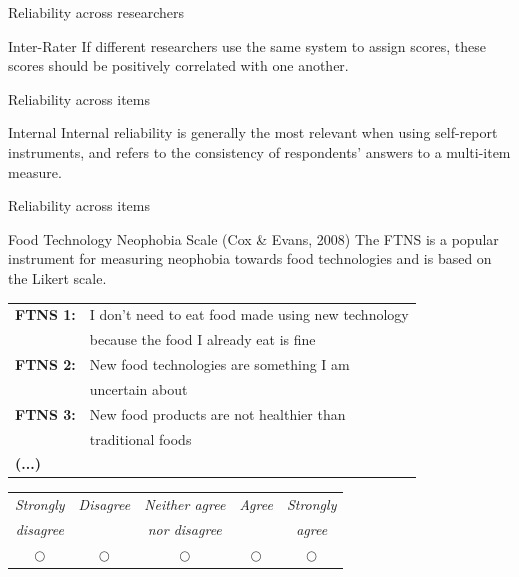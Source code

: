 \documentclass{beamer}
\begin{document}
\begin{frame}{Reliability across researchers}
    \begin{block}{Inter-Rater}
        If different researchers use the same system to assign scores, these scores should be positively correlated with one another.
    \end{block}
\end{frame}

\begin{frame}{Reliability across items}
    \begin{block}{Internal}
        Internal reliability is generally the most relevant when using self-report instruments, and refers to the consistency of respondents' answers to a multi-item measure.
    \end{block}
\end{frame}

\begin{frame}{Reliability across items}
  \begin{block}{Food Technology Neophobia Scale (Cox \& Evans, 2008)}
    The FTNS is a popular instrument for measuring neophobia towards food technologies and is based on the Likert scale.
  \end{block}
  \vspace{0.3cm}
  \small
  \begin{tabular}{l l}
    \textbf{FTNS 1:} & I don't need to eat food made using new technology \\
    & because the food I already eat is fine \\
    \textbf{FTNS 2:} & New food technologies are something I am \\
    & uncertain about \\
    \textbf{FTNS 3:} & New food products are not healthier than \\
    & traditional foods \\
    \textbf{(...)}
  \end{tabular}
  \vspace{0.2cm}
  \begin{center}
    \footnotesize
    \begin{tabular}{ccccc}
      \toprule
      \textit{Strongly} & \textit{Disagree} & \textit{Neither agree} & \textit{Agree} & \textit{Strongly} \\
      \textit{disagree} &  & \textit{nor disagree} &  & \textit{agree} \\
      \midrule
      $\bigcirc$ & $\bigcirc$ & $\bigcirc$ & $\bigcirc$ & $\bigcirc$ \\
      \bottomrule
    \end{tabular}
  \end{center}
\end{frame}
\end{document}
